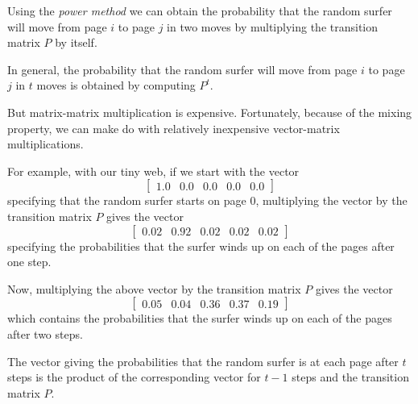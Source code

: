 \documentclass[8pt,a4paper,compress,handout]{beamer}
\begin{document}
\begin{frame}[fragile]
Using the \emph{power method} we can obtain the probability that the random surfer will move from page $i$ to page $j$ in two moves by multiplying the transition matrix $P$ by itself. 

\bigskip

In general, the probability that the random surfer will move from page $i$ to page $j$ in $t$ moves is obtained by computing $P^t$. 

\bigskip 

But matrix-matrix multiplication is expensive. Fortunately, because of the mixing property, we can make do with relatively inexpensive vector-matrix multiplications. 
\end{frame}

\begin{frame}[fragile]
For example, with our tiny web, if we start with the vector 
\[
\begin{bmatrix}
1.0 & 0.0 & 0.0 & 0.0 & 0.0
\end{bmatrix}
\]
specifying that the random surfer starts on page 0, multiplying the vector by the transition matrix $P$ gives the vector 
\[
\begin{bmatrix}
0.02 & 0.92 & 0.02 & 0.02 & 0.02
\end{bmatrix}
\]
specifying the probabilities that the surfer winds up on each of the pages after one step. 

\bigskip

Now, multiplying the above vector by the transition matrix $P$ gives the vector
\[
\begin{bmatrix}
0.05 & 0.04 & 0.36 & 0.37 & 0.19
\end{bmatrix}
\]
which contains the probabilities that the surfer winds up on each of the pages after two steps. 

\bigskip

The vector giving the probabilities that the random surfer is at each page after $t$ steps is the product of the corresponding vector for $t-1$ steps and the transition matrix $P$. 
\end{frame}
\end{document}
